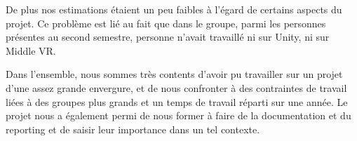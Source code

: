  De plus nos estimations étaient un peu faibles à l'égard de certains aspects du projet.
 Ce problème est lié au fait que dans le groupe, parmi les personnes présentes au second semestre, personne n'avait travaillé ni sur Unity, ni sur Middle VR.
 
 Dans l'ensemble, nous sommes très contents d'avoir pu travailler sur un projet d'une assez grande envergure, et de nous confronter à des contraintes de travail liées à des groupes plus grands et un temps de travail réparti sur une année.
 Le projet nous a également permi de nous former à faire de la documentation et du reporting et de saisir leur importance dans un tel contexte. 
